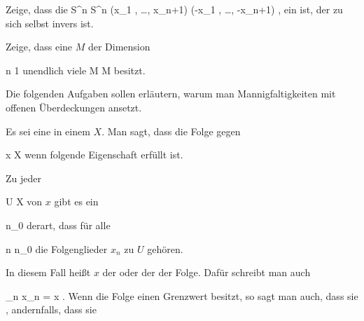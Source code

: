 {}
{

Zeige, dass die
\maabbeledisp {} {S^n } { S^n
} {(x_1 , \ldots , x_{n+1})} {(-x_1 , \ldots , -x_{n+1})
} {,}
ein
 
ist, der zu sich selbst invers ist.

}
{} {}

{}
{

Zeige, dass eine
$M$ der Dimension

\mavergleichskette
{\vergleichskette
{ n
}
{ \geq }{ 1
}
{  }{
}
{    }{
}
{   }{
}
}
{}{}{}
unendlich viele
\maabbdisp {\varphi} { M } { M
} {}
besitzt.

}
{} {}

Die folgenden Aufgaben sollen erläutern, warum man Mannigfaltigkeiten mit offenen Überdeckungen ansetzt.

Es sei
 eine
in einem
$X$. Man sagt, dass die Folge gegen

\mavergleichskette
{\vergleichskette
{ x
}
{ \in }{ X
}
{  }{
}
{    }{
}
{   }{
}
}
{}{}{}
 wenn folgende Eigenschaft erfüllt ist.

Zu jeder

\mavergleichskette
{\vergleichskette
{ U
}
{ \subseteq }{ X
}
{  }{
}
{    }{
}
{   }{
}
}
{}{}{}
von $x$ gibt es ein

\mavergleichskette
{\vergleichskette
{ n_0
}
{ \in }{ \N
}
{  }{
}
{    }{
}
{   }{
}
}
{}{}{}
derart, dass für alle

\mavergleichskette
{\vergleichskette
{ n
}
{ \geq }{ n_0
}
{  }{
}
{    }{
}
{   }{
}
}
{}{}{}
die Folgenglieder $x_n$ zu $U$ gehören.

In diesem Fall heißt $x$ der  oder der  der Folge. Dafür schreibt man auch

\mavergleichskettedisp
{\vergleichskette
{  \lim_{n \rightarrow \infty}  x_n
}
{ =} { x
}
{ } {
}
{ } {
}
{ } {
}
}
{}{}{.}
Wenn die Folge einen Grenzwert besitzt, so sagt man auch, dass sie 
 {} {,}
andernfalls, dass sie 

